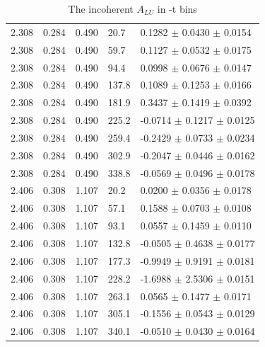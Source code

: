 \begin{table}[!h]
\begin{center}
\begin{tabular}{||l|l|l|l|l||}
 \hline                                                                
  2.308 & 0.284 & 0.490 &  20.7  &  0.1282   $\pm$   0.0430   $\pm$  0.0154  \\
  2.308 & 0.284 & 0.490 &  59.7  &  0.1127   $\pm$   0.0532   $\pm$  0.0175  \\
  2.308 & 0.284 & 0.490 &  94.4  &  0.0998   $\pm$   0.0676   $\pm$  0.0147  \\
  2.308 & 0.284 & 0.490 &  137.8 &  0.1089   $\pm$   0.1253   $\pm$  0.0166  \\
  2.308 & 0.284 & 0.490 &  181.9 &  0.3437   $\pm$   0.1419   $\pm$  0.0392  \\
  2.308 & 0.284 & 0.490 &  225.2 & -0.0714   $\pm$   0.1217   $\pm$  0.0125  \\
  2.308 & 0.284 & 0.490 &  259.4 & -0.2429   $\pm$   0.0733   $\pm$  0.0234  \\
  2.308 & 0.284 & 0.490 &  302.9 & -0.2047   $\pm$   0.0446   $\pm$  0.0162  \\
  2.308 & 0.284 & 0.490 &  338.8 & -0.0569   $\pm$   0.0496   $\pm$  0.0178  \\
 \hline                                                                        
   2.406 & 0.308 & 1.107&  20.2  &  0.0200   $\pm$   0.0356   $\pm$  0.0178  \\
   2.406 & 0.308 & 1.107&  57.1  &  0.1588   $\pm$   0.0703   $\pm$  0.0108  \\
   2.406 & 0.308 & 1.107&  93.1  &  0.0557   $\pm$   0.1459   $\pm$  0.0110  \\
   2.406 & 0.308 & 1.107&  132.8 & -0.0505   $\pm$   0.4638   $\pm$  0.0177  \\
   2.406 & 0.308 & 1.107&  177.3 & -0.9949   $\pm$   0.9191   $\pm$  0.0181  \\
   2.406 & 0.308 & 1.107&  228.2 & -1.6988   $\pm$   2.5306   $\pm$  0.0151  \\
   2.406 & 0.308 & 1.107&  263.1 &  0.0565   $\pm$   0.1477   $\pm$  0.0171  \\
   2.406 & 0.308 & 1.107&  305.1 & -0.1556   $\pm$   0.0543   $\pm$  0.0129  \\
   2.406 & 0.308 & 1.107&  340.1 & -0.0510   $\pm$   0.0430   $\pm$  0.0164  \\

 \hline
 \hline
 \end{tabular}
 \caption{The incoherent $A_{LU}$ in -t bins}
 \label{table:InCoh_t_BSA}
 \end{center}
\end{table}

